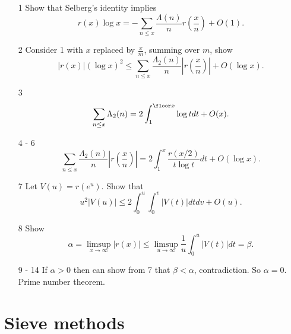 \documentclass[a4paper]{article}
\theoremstyle{definition}
\begin{document}
\begin{enumerate}
\item[1] Show that Selberg's identity implies
  \[
    r(x) \log x = - \sum_{n \leq x} \frac{\Lambda(n)}{n} r (\frac{x}{n}) + O(1).
  \]
\item[2] Consider 1 with \(x\) replaced by \(\frac{x}{m}\), summing over \(m\), show
  \[
    |r(x)| (\log x)^2 \leq \sum_{n \leq x} \frac{\Lambda_2(n)}{n} \left|r(\frac{x}{n})\right| + O(\log x).
  \]
\item[3]
  \[
    \sum_{n \leq x} \Lambda_2(n) = 2 \int_1^{\floor x} \log t dt + O(x).
  \]
\item[4 - 6]
  \[
    \sum_{n \leq x} \frac{\Lambda_2(n)}{n} |r(\frac{x}{n})|
    = 2 \int_1^x \frac{r(x/2)}{t \log t} dt + O(\log x).
  \]
\item[7] Let \(V(u) = r(e^u)\). Show that
  \[
    u^2 |V(u)| \leq 2 \int_0^u \int_0^v |V(t)| dt dv + O(u).
  \]
\item[8] Show
  \[
    \alpha = \limsup_{x \to \infty} |r(x)| \leq \limsup_{u \to \infty} \frac{1}{u} \int_0^u |V(t)| dt = \beta.
  \]
\item[9 - 14] If \(\alpha > 0\) then can show from 7 that \(\beta < \alpha\), contradiction. So \(\alpha = 0\). Prime number theorem.
\end{enumerate}

\section{Sieve methods}
\end{document}
